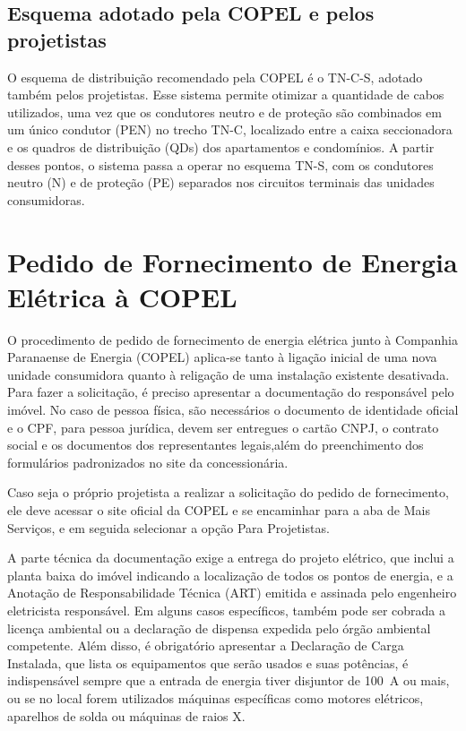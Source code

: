 \documentclass[12pt,openright,oneside,a4paper,brazil]{abntex2}
\begin{document}
\subsection{Esquema adotado pela COPEL e pelos projetistas}

\hspace{1.27cm} O esquema de distribuição recomendado pela COPEL é o TN-C-S, adotado também pelos projetistas. Esse sistema permite otimizar a quantidade de cabos utilizados, uma vez que os condutores neutro e de proteção são combinados em um único condutor (PEN) no trecho TN-C, localizado entre a caixa seccionadora e os quadros de distribuição (QDs) dos apartamentos e condomínios. A partir desses pontos, o sistema passa a operar no esquema TN-S, com os condutores neutro (N) e de proteção (PE) separados nos circuitos terminais das unidades consumidoras.

\section{Pedido de Fornecimento de Energia Elétrica à COPEL}

\hspace{1.27cm}O procedimento de pedido de fornecimento de energia elétrica junto à Companhia Paranaense de Energia (COPEL) aplica-se tanto à ligação inicial de uma nova unidade consumidora quanto à religação de uma instalação existente desativada. Para fazer a solicitação, é preciso apresentar a documentação do responsável pelo imóvel. No caso de pessoa física, são necessários o documento de identidade oficial e o CPF, para pessoa jurídica, devem ser entregues o cartão CNPJ, o contrato social e os documentos dos representantes legais,além do preenchimento dos formulários padronizados no site da concessionária. 

Caso seja o próprio projetista a realizar a solicitação do pedido de fornecimento, ele deve acessar o site oficial da COPEL e se encaminhar para a aba de Mais Serviços, e em seguida selecionar a opção Para Projetistas. 

A parte técnica da documentação exige a entrega do projeto elétrico, que inclui a planta baixa do imóvel indicando a localização de todos os pontos de energia, e a Anotação de Responsabilidade Técnica (ART) emitida e assinada pelo engenheiro eletricista responsável. Em alguns casos específicos, também pode ser cobrada a licença ambiental ou a declaração de dispensa expedida pelo órgão ambiental competente. Além disso, é obrigatório apresentar a Declaração de Carga Instalada, que lista os equipamentos que serão usados e suas potências, é indispensável sempre que a entrada de energia tiver disjuntor de 100~A ou mais, ou se no local forem utilizados máquinas específicas como motores elétricos, aparelhos de solda ou máquinas de raios X.
\end{document}
